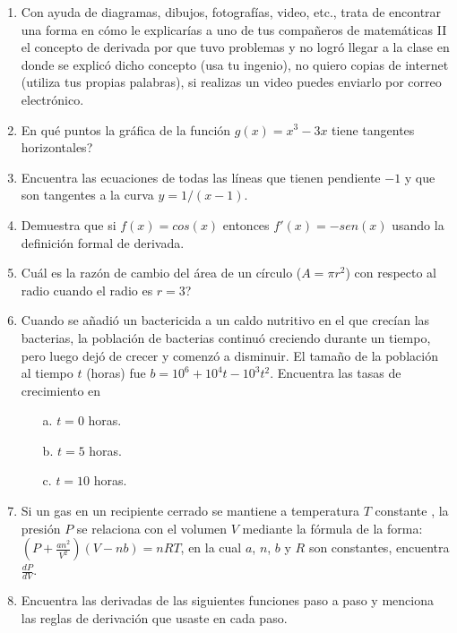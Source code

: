 \documentclass {article}
\begin{document}
\begin{enumerate}

\item Con ayuda de diagramas, dibujos, fotograf\'ias, video, etc., trata de encontrar una forma en c\'omo le explicar\'ias a uno de tus compa\~neros de matem\'aticas II el concepto de derivada por que tuvo problemas y no logr\'o llegar a la clase en donde se explic\'o dicho concepto (usa tu ingenio), no quiero copias de internet (utiliza tus propias palabras), si realizas un video puedes enviarlo por correo electr\'onico.


\item \textquestiondown En qu\'e puntos la gr\'afica de la funci\'on $g(x)=x^3-3x$ tiene tangentes horizontales?

\item Encuentra las ecuaciones de todas las l\'ineas que tienen pendiente $-1$ y que son tangentes a la curva $y=1/(x-1)$.

\item Demuestra que si $f(x)=cos(x)$ entonces $f'(x)=-sen(x)$ usando la definici\'on formal de derivada.

\item \textquestiondown Cu\'al es la raz\'on de cambio del \'area de un c\'irculo ($A=\pi r^2$) con respecto al radio cuando el radio es $r=3$?

\item Cuando se a\~nadi\'o un bactericida a un caldo nutritivo en el que crec\'ian las bacterias, la poblaci\'on de bacterias continu\'o creciendo durante un tiempo, pero luego dej\'o de crecer y comenz\'o a disminuir. El tama\~no de la poblaci\'on al tiempo $t$ (horas) fue $b=10^6+10^4t-10^3t^2$. Encuentra las tasas de crecimiento  en 

\begin{itemize}
\item[a.] $t=0$ horas.
\item[b.] $t=5$ horas.
\item[c.] $t=10$ horas.
\end{itemize}

\item Si un gas en un recipiente cerrado se mantiene a temperatura $T$ constante , la presi\'on $P$ se relaciona con el volumen $V$ mediante la f\'ormula de la forma: $(P+\frac{an^2}{V^2})(V-nb)=nRT$, en la cual $a$, $n$, $b$ y $R$ son constantes, encuentra $\frac{dP}{dV}$.

\item Encuentra las derivadas de las siguientes funciones paso a paso y menciona las reglas de derivaci\'on que usaste en cada paso.
  

\end{enumerate}
\end{document}
